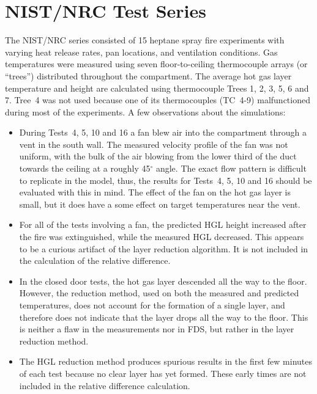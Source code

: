 \clearpage

\section{NIST/NRC Test Series}

The NIST/NRC series consisted of 15 heptane spray fire experiments with varying heat release rates, pan locations, and ventilation conditions.
Gas temperatures were measured using seven floor-to-ceiling thermocouple arrays (or ``trees'') distributed throughout the compartment.  The average hot gas layer temperature and height are calculated using thermocouple Trees 1, 2, 3, 5, 6 and 7. Tree~4 was not used because one of its thermocouples (TC~4-9) malfunctioned during most of the experiments. A few observations about the simulations:
\begin{itemize}
\item During Tests~4, 5, 10 and 16 a fan blew air into the compartment through a vent in the south wall. The measured velocity profile of the fan was not uniform, with the bulk of the air blowing from the lower third of the duct towards the ceiling at a roughly 45$^\circ$ angle.  The exact flow pattern is difficult to replicate in the model, thus, the results for Tests~4, 5, 10 and 16 should be evaluated with this in mind. The effect of the fan on the hot gas layer is small, but it does have a some effect on target temperatures near the vent.
\item For all of the tests involving a fan, the predicted HGL height increased after the fire was extinguished, while the measured HGL decreased.  This appears to be a curious artifact of the layer reduction algorithm. It is not included in the calculation of the relative difference.
\item In the closed door tests, the hot gas layer descended all the way to the floor. However, the reduction method, used on both the measured and predicted temperatures, does not account for the formation of a single layer, and therefore does not indicate that the layer drops all the way to the floor. This is neither a flaw in the measurements nor in FDS, but rather in the layer reduction method.
\item The HGL reduction method produces spurious results in the first few minutes of each test because no clear layer has yet formed. These early times are not included in the relative difference calculation.
\end{itemize}

\newpage

